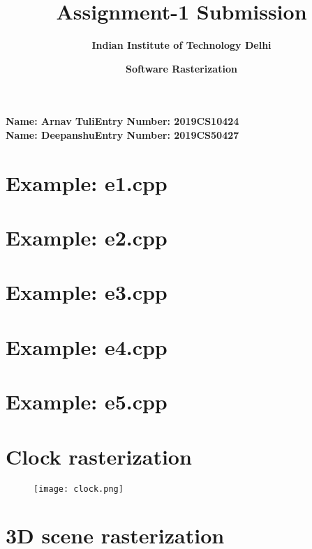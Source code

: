 \documentclass{article}
\title{\textbf{Assignment-1 Submission}}
\author{\textbf{Indian Institute  of Technology Delhi}}
\date{\textbf{Software Rasterization}}
\begin{document}
\maketitle
\textbf{Name: Arnav Tuli\quad \quad Entry Number: 2019CS10424}\\
\textbf{Name: Deepanshu\quad Entry Number: 2019CS50427}
\maketitle

\section{Example: e1.cpp}

\section{Example: e2.cpp}
\section{Example: e3.cpp}
\section{Example: e4.cpp}
\section{Example: e5.cpp}

\section{Clock rasterization}
\begin{figure}[H]
    \centering
    \texttt{[image: clock.png]}
    \end{figure}

\section{3D scene rasterization}
\end{document}
